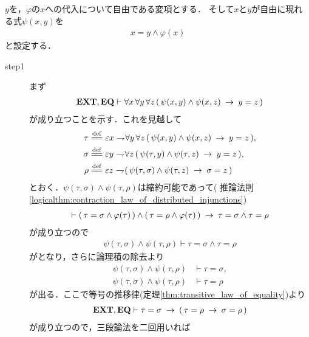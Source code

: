 	\begin{sketch}
		$y$を，$\varphi$の$x$への代入について自由である変項とする．
		そして$x$と$y$が自由に現れる式$\psi(x,y)$を
		\begin{align}
			x = y \wedge \varphi(x)
		\end{align}
		と設定する．
		\begin{description}
			\item[step1]
				まず
				\begin{align}
					\mbox{{\bf EXT}},\mbox{{\bf EQ}} \vdash \forall x\, \forall y\, \forall z\, 
					(\, \psi(x,y) \wedge \psi(x,z) \hspace{0.25em}\rightarrow\hspace{0.25em} y = z\, )
					\label{fom:thm_axiom_of_separation_1}
				\end{align}
				が成り立つことを示す．これを見越して
				\begin{align}
					\tau &\defeq \varepsilon x \negation \forall y\, \forall z\, 
					(\, \psi(x,y) \wedge \psi(x,z) \rarrow y = z\, ), \\
					\sigma &\defeq \varepsilon y \negation \forall z\, 
					(\, \psi(\tau,y) \wedge \psi(\tau,z) \rarrow y = z\, ), \\
					\rho &\defeq \varepsilon z \negation 
					(\, \psi(\tau,\sigma) \wedge \psi(\tau,z) \rarrow \sigma = z\, )
				\end{align}
				とおく．$\psi(\tau,\sigma) \wedge \psi(\tau,\rho)$は縮約可能であって(
				推論法則\ref{logicalthm:contraction_law_of_distributed_injunctions})
				\begin{align}
					\vdash (\, \tau = \sigma \wedge \varphi(\tau)\, )
						\wedge (\, \tau = \rho \wedge \varphi(\tau)\, )
						\hspace{0.25em}\rightarrow\hspace{0.25em} \tau = \sigma \wedge \tau = \rho
				\end{align}
				が成り立つので
				\begin{align}
					\psi(\tau,\sigma) \wedge \psi(\tau,\rho) 
					\vdash \tau = \sigma \wedge \tau = \rho
				\end{align}
				がとなり，さらに論理積の除去より
				\begin{align}
					\psi(\tau,\sigma) \wedge \psi(\tau,\rho) &\vdash \tau = \sigma, \\
					\psi(\tau,\sigma) \wedge \psi(\tau,\rho) &\vdash \tau = \rho
				\end{align}
				が出る．ここで等号の推移律(定理\ref{thm:transitive_law_of_equality})より
				\begin{align}
					\mbox{{\bf EXT}},\mbox{{\bf EQ}} \vdash \tau = \sigma \hspace{0.25em}\rightarrow\hspace{0.25em} 
						(\, \tau = \rho \hspace{0.25em}\rightarrow\hspace{0.25em} \sigma = \rho\, )
				\end{align}
				が成り立つので，三段論法を二回用いれば

\end{description}
\end{sketch}
